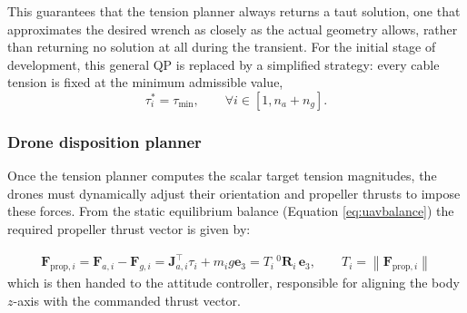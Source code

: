 This guarantees that the tension planner always returns a taut solution, one that approximates the desired wrench as closely as the actual geometry allows, rather than returning no solution at all during the transient.
For the initial stage of development, this general QP is replaced by a simplified strategy: every cable tension is fixed at the minimum admissible value,
\begin{equation}
    \tau_i^* = \tau_{\min}, \qquad \forall i\in[1,n_a+n_g].
\label{eq:tau-min-simplification}
\end{equation}



\subsubsection{Drone disposition planner}
Once the tension planner computes the scalar target tension magnitudes, the drones must dynamically adjust their orientation and propeller thrusts to impose these forces. 
From the static equilibrium balance (Equation \eqref{eq:uavbalance}) the required propeller thrust vector is given by:

\begin{equation}
\begin{aligned}
    \mathbf{F}_{\mathrm{prop},i}
    = \mathbf{F}_{a,i} - \mathbf{F}_{g,i}
    = \mathbf{J}_{a,i}^{\top}\tau_i + m_i g\mathbf{e}_3
    = T_i\,{}^0\mathbf{R}_i\,\mathbf{e}_3, \qquad T_i =
    \left\|
        \mathbf{F}_{\mathrm{prop},i}
    \right\|
\end{aligned}
\label{eq:drone-disposition}
\end{equation}
which is then handed to the attitude controller, responsible for aligning the body $z$-axis with the commanded thrust vector.



